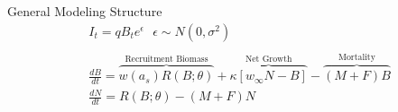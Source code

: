 \documentclass[ xcolor = pdftex, dvipsnames, table ]{beamer}
\begin{document}
%
\begin{frame}{General Modeling Structure}
\begin{align*}%
&I_t = q B_t e^\epsilon ~~~ \epsilon\sim N(0, \sigma^2)\\
&\\
&\frac{dB}{dt} = \overbrace{w(a_s)R(B;\theta)}^\text{Recruitment Biomass} + \overbrace{\kappa \left[w_\infty N-B\right]}^\text{Net Growth} - \overbrace{(M+F)B}^\text{Mortality} \\%
&\frac{dN}{dt} = R(B;\theta) - (M+F)N \\%
\end{align*}
\end{frame}
\end{document}
